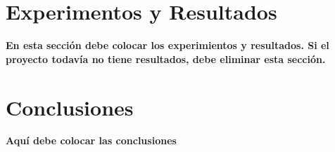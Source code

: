 \documentclass[conference]{IEEEtran}
\begin{document}
\section{Experimentos y Resultados} \label{experimentos}
\textbf{En esta sección debe colocar los experimientos y resultados. Si el proyecto todavía no tiene resultados, debe eliminar esta sección.}

\section{Conclusiones}
\textbf{Aquí debe colocar las conclusiones}



\vspace{12pt}
\end{document}
